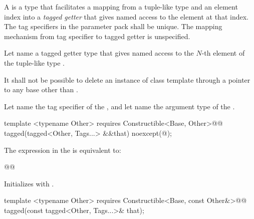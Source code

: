 {\pnum
A  is a type that facilitates a mapping from a tuple-like type and an
element index into a \textit{tagged getter} that gives named access to the element at that index.
 The tag specifiers in the
 parameter pack shall be unique. \enternote The mapping mechanism from tag specifier to
tagged getter is unspecified.\exitnote

\pnum Let  name a tagged getter type that gives named
access to the $N$-th element of the tuple-like type .

\pnum It shall not be possible to delete an instance of class template  through a
pointer to any base other than .

\pnum
{}
 Let
 name the tag specifier of the  , and let
 name the argument type of the  .

\begin{itemdecl}
template <typename Other>
  requires Constructible<Base, Other>@\newtxt{()}@
tagged(tagged<Other, Tags...> &&that) noexcept(@\seebelow@);
\end{itemdecl}

\begin{itemdescr}
\pnum
\remarks The expression in the  is equivalent to:

\begin{codeblock}
@@
\end{codeblock}

\pnum
\effects Initializes  with .
\end{itemdescr}

\begin{itemdecl}
template <typename Other>
  requires Constructible<Base, const Other&>@\newtxt{()}@
tagged(const tagged<Other, Tags...>& that);
\end{itemdecl}

}
